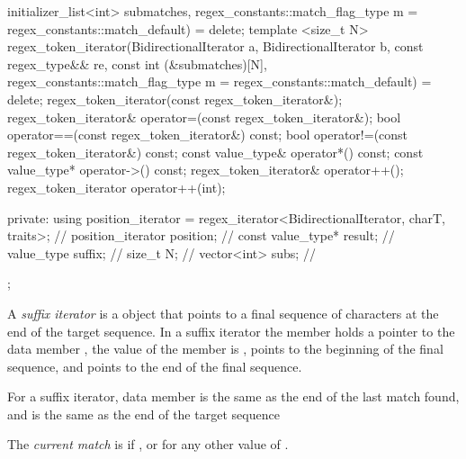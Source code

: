 \begin{codeblock}
{{                         initializer_list<int> submatches,
                         regex_constants::match_flag_type m =
                           regex_constants::match_default) = delete;
    template <size_t N>
    regex_token_iterator(BidirectionalIterator a, BidirectionalIterator b,
                         const regex_type&& re,
                         const int (&submatches)[N],
                         regex_constants::match_flag_type m =
                           regex_constants::match_default) = delete;                         
    regex_token_iterator(const regex_token_iterator&);
    regex_token_iterator& operator=(const regex_token_iterator&);
    bool operator==(const regex_token_iterator&) const;
    bool operator!=(const regex_token_iterator&) const;
    const value_type& operator*() const;
    const value_type* operator->() const;
    regex_token_iterator& operator++();
    regex_token_iterator operator++(int);

  private:
    using position_iterator =
          regex_iterator<BidirectionalIterator, charT, traits>; // \expos
    position_iterator position;                                 // \expos
    const value_type* result;                                   // \expos
    value_type suffix;                                          // \expos
    size_t N;                                                   // \expos
    vector<int> subs;                                           // \expos
  };
}
\end{codeblock}

\pnum
A \textit{suffix iterator} is a  object
that points to a final sequence of characters at
the end of the target sequence. In a suffix iterator the
member  holds a pointer to the data
member , the value of the member 
is ,  points to the beginning of the
final sequence, and  points to the end of the
final sequence.

\pnum
\begin{note} For a suffix iterator, data
member  is the same as the end of the last match
found, and  is the same as the end of the target
sequence \end{note}

\pnum
The \textit{current match} is  if , or
 for any other value of .

